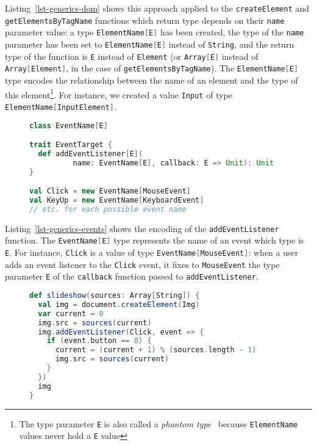 \documentclass{llncs}
\newcommand{\jscode}[1]{\lstinline[language=JavaScript]|#1|}
\newcommand{\scalacode}[1]{\lstinline[language=Scala]|#1|}
\begin{document}
Listing~\ref{lst-generics-dom} shows this approach applied to the \jscode{createElement} and \jscode{getElementsByTagName} functions which return type depends on their \jscode{name} parameter value: a type \scalacode{ElementName[E]} has been created, the type of the \scalacode{name} parameter has been set to \scalacode{ElementName[E]} instead of \scalacode{String}, and the return type of the function is \scalacode{E} instead of \scalacode{Element} (or \scalacode{Array[E]} instead of \scalacode{Array[Element]}, in the case of \scalacode{getElementsByTagName}). The \scalacode{ElementName[E]} type encodes the relationship between the name of an element and the type of this element\footnote{The type parameter \scalacode{E} is also called a \emph{phantom type}~\cite{leijen1999domain} because \scalacode{ElementName} values never hold a \scalacode{E} value}. For instance, we created a value \scalacode{Input} of type \scalacode{ElementName[InputElement]}.

\begin{figure}
\begin{lstlisting}[label=lst-generics-events,language=Scala,caption={Encoding of the \jscode{addEventListener} function using type parameters}]
class EventName[E]

trait EventTarget {
  def addEventListener[E](
          name: EventName[E], callback: E => Unit): Unit
}

val Click = new EventName[MouseEvent]
val KeyUp = new EventName[KeyboardEvent]
// etc. for each possible event name
\end{lstlisting}
\end{figure}

Listing~\ref{lst-generics-events} shows the encoding of the \jscode{addEventListener} function. The \scalacode{EventName[E]} type represents the name of an event which type is \scalacode{E}. For instance, \scalacode{Click} is a value of type \scalacode{EventName[MouseEvent]}: when a user adds an event listener to the \scalacode{Click} event, it fixes to \scalacode{MouseEvent} the type parameter \scalacode{E} of the \scalacode{callback} function passed to \scalacode{addEventListener}.

\begin{figure}
\begin{lstlisting}[label=lst-slideshow-generics,language=Scala,caption={Scala implementation of the \texttt{slideshow} function using generics}]
def slideshow(sources: Array[String]) {
  val img = document.createElement(Img)
  var current = 0
  img.src = sources(current)
  img.addEventListener(Click, event => {
    if (event.button == 0) {
      current = (current + 1) % (sources.length - 1)
      img.src = sources(current)
    }
  })
  img
}
\end{lstlisting}
\end{figure}
\end{document}
